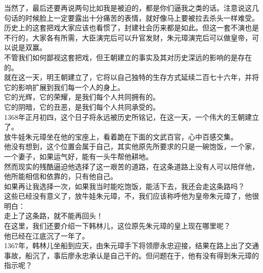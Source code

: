 \begin{multicols}{\theparacolNo}
当然了，最后还要再说两句比如我是被迫的，都是你们逼我之类的话。注意说这几句话的时候脸上一定要露出十分痛苦的表情，就好像马上要被拉去杀头一样难受。\\

历史上的这套把戏大家应该也看惯了，封建社会历来都是如此。但这一套不演也是不行的，大家各有所需，大臣演完后可以升官发财，朱元璋演完后可以做皇帝，可以说是双赢。\\

不管我们如何鄙视这套把戏，但王朝建立的事实及其对历史深远的影响的是存在的。\\

就在这一天，明王朝建立了，它将以自己独特的生存方式延续二百七十六年，并将它的影响扩展到我们每一个人的身上。\\

它的光辉，它的荣耀，是我们每个人共同拥有的。\\

它的阴暗，它的丑恶，是我们每个人共同承受的。\\

1368年正月初四，这个日子将永远被历史所铭记，在这一天，一个伟大的王朝建立了。\\

放牛娃朱元璋坐在他的宝座上，看着跪在下面的文武百官，心中百感交集。\\

他没有想到，这个位置会属于自己，其实他原先所要求的只是一碗饱饭，一个家，一个妻子，如果运气好，能有一头牛帮他耕地。\\

然而现实的残酷逼迫他选择了这一艰苦的道路，在这条道路上没有人可以陪伴他，他所能相信和依靠的，只有他自己。\\

如果再让我选择一次，如果我当时能吃饱饭，能活下去，我还会走这条路吗？\\

这些已经没有意义了，放牛娃朱元璋，不，我们应该称呼他为皇帝朱元璋了，他很明白：\\

走上了这条路，就不能再回头！\\

在这里，我们还要介绍一下韩林儿，这位原先朱元璋的皇上现在哪里呢？\\

他已经在江底沉了一年了。\\

1367年，韩林儿坐船到应天，由朱元璋手下将领廖永忠迎接，结果在路上出了交通事故，船沉了，事后廖永忠承认是自己干的。但问题在于，他有没有得到朱元璋的指示呢？\\


\end{multicols}
